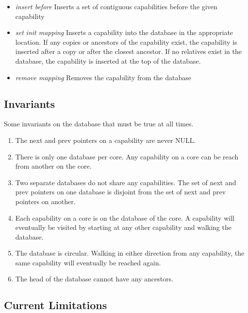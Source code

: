 \documentclass{scrreprt}
\begin{document}
\begin{itemize}
    \item \emph{insert before} Inserts a set of contiguous capabilities
      before the given capability

    \item \emph{set init mapping} Inserts a capability into the database
      in the appropriate location.
      If any copies or ancestors of the capability exist,
      the capability is inserted after a copy or after the closest ancestor.
      If no relatives exist in the database,
      the capability is inserted at the top of the database.

    \item \emph{remove mapping} Removes the capability from the database
  \end{itemize}

  \subsection{Invariants}

  Some invariants on the database that must be true at all times.
  \begin{enumerate}
  \item The next and prev pointers on a capability are never NULL.
  \item There is only one database per core.
    Any capability on a core can be reach from another on the core.
  \item Two separate databases do not share any capabilities.
    The set of next and prev pointers on one database
    is disjoint from the set of next and prev pointers on another.
  \item Each capability on a core is on the database of the core.
    A capability will eventually be visited by starting at any other capability
    and walking the database.
  \item The database is circular.
    Walking in either direction from any capability,
    the same capability will eventually be reached again.
  \item The head of the database cannot have any ancestors.
  \end{enumerate}

  \subsection{Current Limitations}
\end{document}
